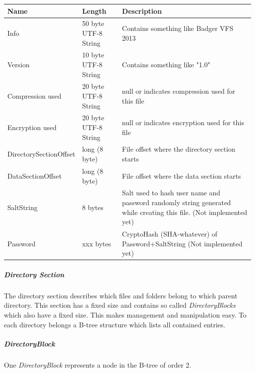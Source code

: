 \begin{tabular}{|l|l|p{5cm}|}
\hline
\textbf{Name} & \textbf{Length} & \textbf{Description}
\\  \hline
Info & 50 byte UTF-8 String & Contains something like Badger VFS 2013
\\ \hline
Version & 10 byte UTF-8 String & Contains something like "1.0"
\\ \hline
Compression used & 20 byte UTF-8 String & null or indicates compression used for this file
\\ \hline
Encryption used & 20 byte UTF-8 String & null or indicates encryption used for this file
\\ \hline
DirectorySectionOffset & long (8 byte) &  File offset where the directory
section starts \\ \hline
DataSectionOffset & long (8 byte) &  File offset where the data section starts
\\ \hline
 SaltString & 8 bytes  & Salt used to hash user name and password randomly string generated while creating this
   file. (Not implemented yet)
 \\ \hline
  Password & xxx bytes  & CryptoHash (SHA-whatever) of Password+SaltString  (Not implemented yet)
\\ \hline

\end{tabular}


\subparagraph{Directory Section}
The directory section describes which files and folders belong to which parent
directory. This section has a fixed size and contains so called
\textit{DirectoryBlocks} which also have a fixed size. This makes management and
manipulation easy. To each directory belongs a B-tree structure which lists all
contained entries.


\subparagraph*{DirectoryBlock}

One \textit{DirectoryBlock} represents a node in the B-tree of order 2.


